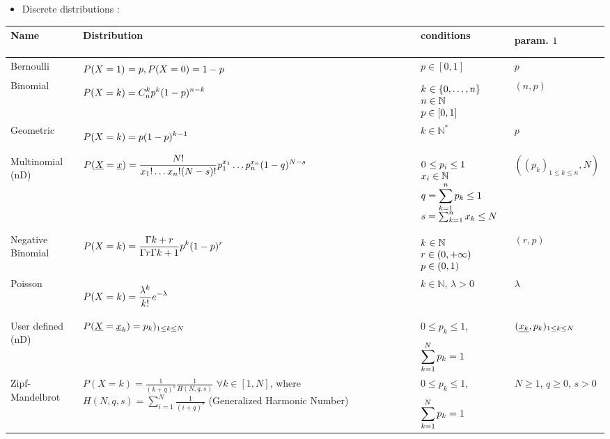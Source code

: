 \begin{itemize}
\item Discrete distributions :
\end{itemize}
{\footnotesize
  \noindent \begin{tabular}{|p{2cm}|p{8cm}|p{4cm}|p{2cm}|}
    \hline
    Name & Distribution & \multicolumn{1}{l|}{conditions} & param. $1^{\strut}_{\strut}$\\
    \hline
    Bernoulli & $\displaystyle P(X = 1)^{\strut} = p, P(X = 0) = 1-p $ & $p \in [0,1]$ & $p$\\
    \hline
    Binomial & $\displaystyle P(X = k) = C_n^k p^k (1-p)^{{n-k}^{\strut}}$ &
    $\begin{array}{@{}l@{}}
      k^{\strut} \in \{0, \hdots, n\} \\
      n \in \mathbb{N} \\
      p \in [0,1]
    \end{array}
    $
    & $(n,p)$\\
    \hline
    Geometric & $\displaystyle P(X = k) = p(1-p)^{k^{\strut}-1}_{\strut}$ & $k \in \mathbb{N}^{*}$ & $p$\\
    \hline
    Multinomial (nD) & $\displaystyle P({\underline{X}} = {\underline{x}}) = \frac{N!}{x_1!\dots x_n! (N-s)!}p_1^{x_1}\dots p_n^{x_n}(1-q)^{N-s}$ &
    $\begin{array}{@{}l@{}}
      0^{\strut}\leq p_i \leq 1 \\
      x_i\in \mathbb{N} \\
      \displaystyle q = \sum_{k=1}^n p_k \leq 1 \\
      s=  \sum_{k=1}^n x_k \leq N_{\strut}
    \end{array}
    $
    & $((p_k)_{1 \leq k \leq n}, N)$\\
    \hline
    Negative Binomial & $\displaystyle P(X = k) = \frac{\Gamma{k + r}}{\Gamma{r}\Gamma{k+1}}p^k (1-p)^{r^{\strut}}$ &
    $\begin{array}{@{}l@{}}
      k^{\strut} \in \Nset\\
      r \in (0,+\infty) \\
      p \in (0,1)
    \end{array}
    $
    & $(r,p)$\\
    \hline
    Poisson & $ \displaystyle P(X = k) =  \frac{\lambda^{k^{\strut}}}{k!_{\strut}}e^{-\lambda}$ & $k \in \mathbb{N}$, $\lambda >0$ & $\lambda$ \\
    \hline
    User defined (nD) &  $P({\underline{X}} = {\underline{x}}_k) = p_k)_{1 \leq k \leq N}$ & $0\leq p_k \leq 1$, $\displaystyle \sum_{k=1}^{N^{\strut}} p_k = 1$ & $({\underline{x_k}}, p_k)_{1 \leq k \leq N}$\\
    \hline
    Zipf-Mandelbrot &  $P(X=k) = \frac{1}{(k+q)^s} \frac{1}{H(N,q,s)}$ $ \forall k\in [1,N]$, where $H(N,q,s) = \sum_{i=1}^{N} \displaystyle \frac{1}{(i+q)^s}$ (Generalized Harmonic Number) & $0\leq p_k \leq 1$, $\displaystyle \sum_{k=1}^{N^{\strut}} p_k = 1$ & $N \geq 1$, $q \geq 0$, $s>0$ \\
    \hline
  \end{tabular}
}

